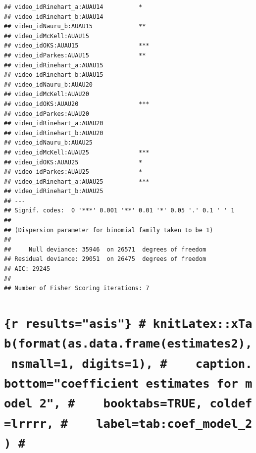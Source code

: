 \documentclass{monashthesis}
\begin{document}
\begin{verbatim}
## video_idRinehart_a:AUAU14          *  
## video_idRinehart_b:AUAU14             
## video_idNauru_b:AUAU15             ** 
## video_idMcKell:AUAU15                 
## video_idOKS:AUAU15                 ***
## video_idParkes:AUAU15              ** 
## video_idRinehart_a:AUAU15             
## video_idRinehart_b:AUAU15             
## video_idNauru_b:AUAU20                
## video_idMcKell:AUAU20                 
## video_idOKS:AUAU20                 ***
## video_idParkes:AUAU20                 
## video_idRinehart_a:AUAU20             
## video_idRinehart_b:AUAU20             
## video_idNauru_b:AUAU25                
## video_idMcKell:AUAU25              ***
## video_idOKS:AUAU25                 *  
## video_idParkes:AUAU25              *  
## video_idRinehart_a:AUAU25          ***
## video_idRinehart_b:AUAU25             
## ---
## Signif. codes:  0 '***' 0.001 '**' 0.01 '*' 0.05 '.' 0.1 ' ' 1
## 
## (Dispersion parameter for binomial family taken to be 1)
## 
##     Null deviance: 35946  on 26571  degrees of freedom
## Residual deviance: 29051  on 26475  degrees of freedom
## AIC: 29245
## 
## Number of Fisher Scoring iterations: 7
\end{verbatim}

\hypertarget{r-resultsasis-knitlatexxtabformatas.data.frameestimates2-nsmall1-digits1-caption.bottomcoefficient-estimates-for-model-2-booktabstrue-coldeflrrrr-labeltabcoef_model_2}{%
\chapter{\texorpdfstring{\texttt{\{r\ results="asis"\}\ \#\ knitLatex::xTab(format(as.data.frame(estimates2),\ nsmall=1,\ digits=1),\ \#\ \ \ \ caption.bottom="coefficient\ estimates\ for\ model\ 2",\ \#\ \ \ \ booktabs=TRUE,\ coldef=\textquotesingle{}lrrrr\textquotesingle{},\ \#\ \ \ \ label=\textquotesingle{}tab:coef\_model\_2\textquotesingle{})\ \#}}{\{r results="asis"\} \# knitLatex::xTab(format(as.data.frame(estimates2), nsmall=1, digits=1), \#    caption.bottom="coefficient estimates for model 2", \#    booktabs=TRUE, coldef='lrrrr', \#    label='tab:coef\_model\_2') \#}}\label{r-resultsasis-knitlatexxtabformatas.data.frameestimates2-nsmall1-digits1-caption.bottomcoefficient-estimates-for-model-2-booktabstrue-coldeflrrrr-labeltabcoef_model_2}}

\hypertarget{section}{%
\chapter{}\label{section}}
\end{document}
